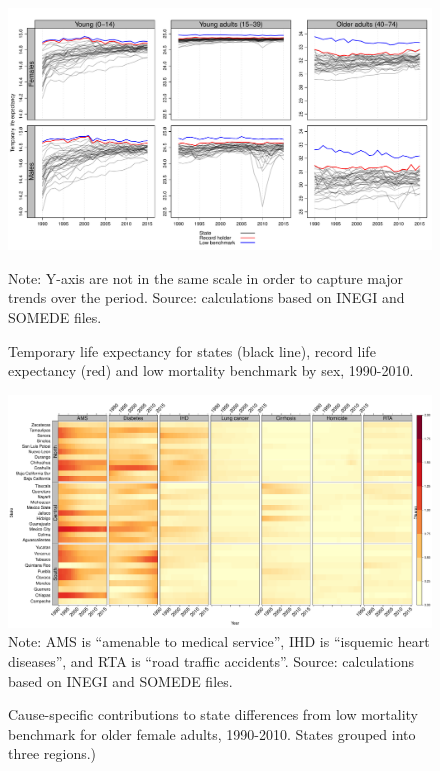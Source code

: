 \documentclass[11.5pt]{article}
\begin{document}
\begin{spacing}{1.5}
\begin{figure}[h!]
\centering
\caption{Temporary life expectancy for states (black line), record life
expectancy (red) and low mortality benchmark by sex, 1990-2010.}
\label{Fig1:temp}
\includegraphics[scale=.5]{Figure_1.pdf}

Note: Y-axis are not in the same scale in order to capture major trends over the period. Source: calculations based on INEGI and SOMEDE files. 
\end{figure}


\begin{figure}[h!]
\centering
\caption{Cause-specific contributions to state differences from low mortality benchmark for older female adults, 1990-2010. States grouped into three regions.)}
\label{fig:e40_74_females}
\includegraphics[scale=.31]{Adult_Female_heatmap.pdf}
Note: AMS is ``amenable to medical service'', IHD is ``isquemic heart diseases'', and RTA is ``road traffic accidents''. Source: calculations based on INEGI and SOMEDE files. \end{figure}



\end{spacing}
\end{document}
